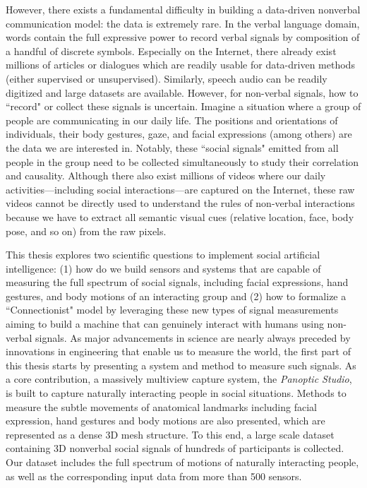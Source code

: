 However, there exists a fundamental difficulty in building a data-driven nonverbal communication model: the data is extremely rare. In the verbal language domain, words contain the full expressive power to record verbal signals by composition of a handful of discrete symbols. Especially on the Internet, there already exist millions of articles or dialogues which are readily usable for data-driven methods (either supervised or unsupervised). Similarly, speech audio can be readily digitized and large datasets are available. However, for non-verbal signals, how to ``record" or collect these signals is uncertain. Imagine a situation where a group of people are communicating in our daily life. The positions and orientations of individuals, their body gestures, gaze, and facial expressions (among others) are the data we are interested in. Notably, these ``social signals" emitted from all people in the group need to be collected simultaneously to study their correlation and causality. Although there also exist millions of videos where our daily activities---including social interactions---are captured on the Internet, these raw videos cannot be directly used to understand the rules of non-verbal interactions because we have to extract all semantic visual cues (relative location, face, body pose, and so on) from the raw pixels. %



This thesis explores two scientific questions to implement social artificial intelligence: (1) how do we build sensors and systems that are capable of measuring the full spectrum of social signals, including facial expressions, hand gestures, and body motions of an interacting group and (2) how to formalize a ``Connectionist" model by leveraging these new types of signal measurements aiming to build a machine that can genuinely interact with humans using non-verbal signals. As major advancements in science are nearly always preceded by innovations in engineering that enable us to measure the world, the first part of this thesis starts by presenting a system and method to measure such signals. As a core contribution, a massively multiview capture system, the \emph{Panoptic Studio}, is built to capture naturally interacting people in social situations. Methods to measure the subtle movements of anatomical landmarks including facial expression, hand gestures and body motions are also presented, which are represented as a dense 3D mesh structure. To this end, a large scale dataset containing 3D nonverbal social signals of hundreds of participants is collected. Our dataset includes the full spectrum of motions of naturally interacting people, as well as the corresponding input data from more than 500 sensors.

